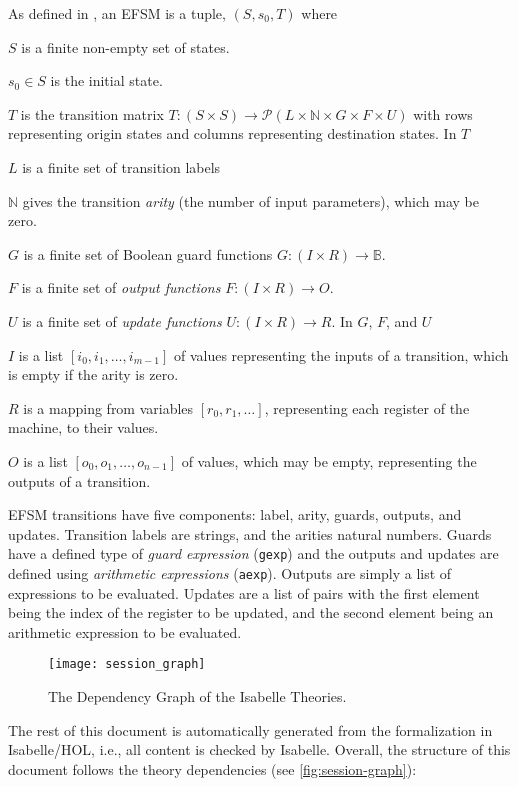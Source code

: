 \documentclass[10pt,DIV16,a4paper,abstract=true,twoside=semi,openright]{scrreprt}
\newcommand\mydescriptionlabel[1]{\hspace{\leftmargini}\textbf{#1}}
\newenvironment{where}{%
  \let\descriptionlabel\mydescriptionlabel
  \description[itemsep=0em, font=\normalfont]
}{%
  \enddescription
}
\begin{document}
As defined in \cite{foster2018}, an EFSM is a tuple, $(S, s_0, T)$ where
\begin{where}
  \item [$S$] is a finite non-empty set of states.
  \item [$s_0 \in S$]is the initial state.
  \item [$T$] is the transition matrix $T:(S \times S) \to \mathcal{P}(L \times \mathbb{N} \times G \times F \times U)$ with rows representing origin states and columns representing destination states.
\end{where}
In $T$
\begin{where}
  \item [$L$] is a finite set of transition labels
  \item [$\mathbb{N}$] gives the transition \emph{arity} (the number of input parameters), which may be zero.
  \item [$G$] is a finite set of Boolean guard functions $G:(I \times R) \to \mathbb{B}$.
  \item [$F$] is a finite set of \emph{output functions} $F:(I \times R) \to O$.
  \item [$U$] is a finite set of \emph{update functions} $U:(I \times R) \to R$.
\end{where}
In $G$, $F$, and $U$
\begin{where}
  \item [$I$] is a list $[i_0, i_1, \ldots, i_{m-1}]$ of values representing the inputs of a transition, which is empty if the arity is zero.
  \item [$R$] is a mapping from variables $[r_0, r_1, \ldots]$, representing each register of the machine, to their values.
  \item [$O$] is a list $[o_0, o_1, \ldots, o_{n-1}]$ of values, which may be empty, representing the outputs of a transition.
\end{where}

EFSM transitions have five components: label, arity, guards, outputs, and updates. Transition labels are strings, and the arities natural numbers. Guards have a defined type of \emph{guard expression} (\texttt{gexp}) and the outputs and updates are defined using \emph{arithmetic expressions} (\texttt{aexp}). Outputs are simply a list of expressions to be evaluated. Updates are a list of pairs with the first element being the index of the register to be updated, and the second element being an arithmetic expression to be evaluated.

\begin{figure}
  \centering
  \texttt{[image: session\_graph]}
  \caption{The Dependency Graph of the Isabelle Theories.\label{fig:session-graph}}
\end{figure}
The rest of this document is automatically generated from the
formalization in Isabelle/HOL, i.e., all content is checked by
Isabelle.  Overall, the structure of this document follows the
theory dependencies (see \autoref{fig:session-graph}):

\nocite{foster2018}

\clearpage




{\small
  
  
}
\end{document}
